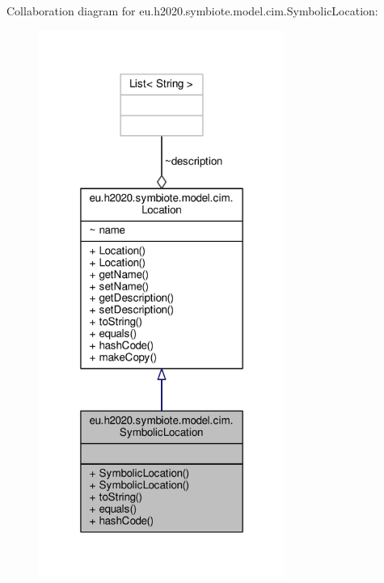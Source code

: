 Collaboration diagram for eu.\+h2020.\+symbiote.\+model.\+cim.\+Symbolic\+Location\+:\nopagebreak
\begin{figure}[H]
\begin{center}
\leavevmode
\includegraphics[width=228pt]{classeu_1_1h2020_1_1symbiote_1_1model_1_1cim_1_1SymbolicLocation__coll__graph}
\end{center}
\end{figure}
